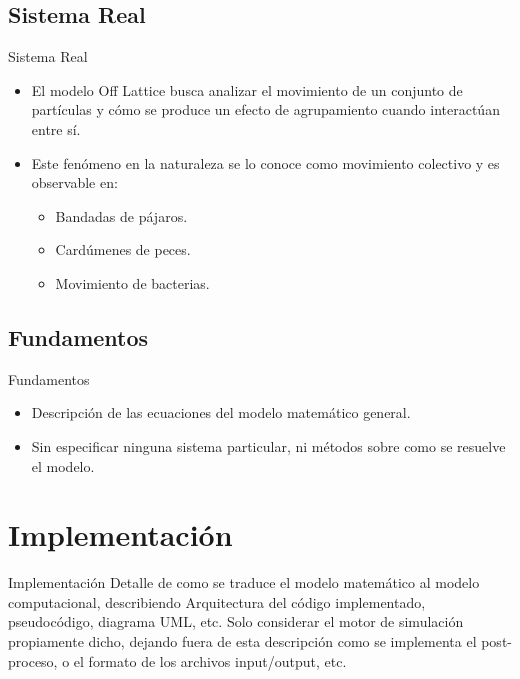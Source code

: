\documentclass{beamer}
\begin{document}
    \subsection{Sistema Real}

    \begin{frame}{Sistema Real}
        \begin{itemize}
            \item
            El modelo Off Lattice busca analizar el movimiento de un conjunto de partículas y cómo se produce un efecto
            de agrupamiento cuando interactúan entre sí.
            \item
            Este fenómeno en la naturaleza se lo conoce como movimiento colectivo y es observable en:
                \begin{itemize}
                    \item Bandadas de pájaros.
                    \item Cardúmenes de peces.
                    \item Movimiento de bacterias.
                \end{itemize}
        \end{itemize}
    \end{frame}

    \subsection{Fundamentos}

    \begin{frame}{Fundamentos}
        \begin{itemize}
            \item
            Descripción de las ecuaciones del modelo matemático general.
            \item
            Sin especificar ninguna sistema particular, ni métodos sobre como se resuelve el modelo.
        \end{itemize}
    \end{frame}

    \section{Implementación}

    \begin{frame}{Implementación}
        Detalle de como se traduce el modelo matemático al modelo computacional,
        describiendo Arquitectura del código implementado, pseudocódigo, diagrama UML, etc.
        Solo considerar el motor de simulación propiamente dicho, dejando fuera de esta descripción
        como se implementa el post-proceso, o el formato de los archivos input/output, etc.
    \end{frame}
\end{document}
